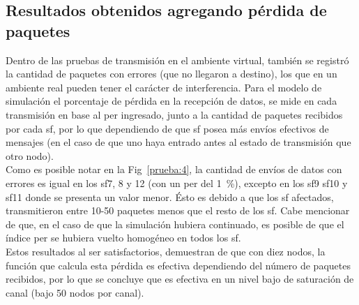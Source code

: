 \begin{justify}
\subsection{Resultados obtenidos agregando pérdida de paquetes}
Dentro de las pruebas de transmisión en el ambiente virtual, también se registró la cantidad de paquetes con errores (que no llegaron a destino), los que en un ambiente real pueden tener el carácter de interferencia. Para el modelo de simulación el porcentaje de pérdida en la recepción de datos, se mide en cada transmisión en base al \gls{per} ingresado, junto a la cantidad de paquetes recibidos por cada \gls{sf}, por lo que dependiendo de que \gls{sf} posea más envíos efectivos de mensajes (en el caso de que uno haya entrado antes al estado de transmisión que otro nodo).\\
Como es posible notar en la Fig~\ref{prueba:4}, la cantidad de envíos de datos con errores es igual en los \gls{sf}7, 8 y 12 (con un \gls{per} del \SI{1}{\percent}), excepto en los \gls{sf}9 \gls{sf}10 y \gls{sf}11 donde se presenta un valor menor. Ésto es debido a que los \gls{sf} afectados, transmitieron entre 10-50 paquetes menos que el resto de los \gls{sf}. Cabe mencionar de que, en el caso de que la simulación hubiera continuado, es posible de que el índice \gls{per} se hubiera vuelto homogéneo en todos los \gls{sf}.\\
Estos resultados al ser satisfactorios, demuestran de que con diez nodos, la función que calcula esta pérdida es efectiva dependiendo del número de paquetes recibidos, por lo que se concluye que es efectiva en un nivel bajo de saturación de canal (bajo 50 nodos por canal).
\begin{figure}[!ht]
\centering

\end{figure}
\end{justify}
